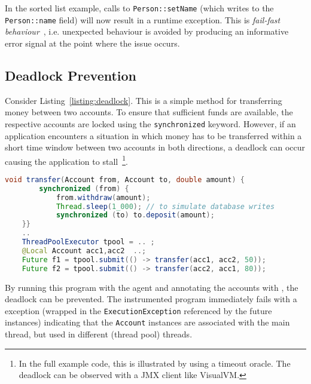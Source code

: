 In the sorted list example, calls to \texttt{Person::setName} (which writes to the \texttt{Person::name} field) will now result in a runtime exception. 
This is \textit{fail-fast behaviour}~\cite{shore2004fail}, i.e. unexpected behaviour is avoided by producing an informative error signal at the point where the issue occurs. 

\subsection{Deadlock Prevention}	

Consider Listing~\ref{listing:deadlock}.  This is a simple method for transferring money between two accounts. To ensure that sufficient funds are available, the respective accounts are locked using the \texttt{synchronized} keyword.  However, if an application encounters a situation in which money has to be transferred within a short time window between two accounts in both directions, a deadlock can occur causing the application to stall~\footnote{In the full example code, this is illustrated by using a timeout oracle. The deadlock can be observed with a JMX client like VisualVM.}.


\begin{lstlisting}[language=Java, caption=Money transfer implementation prone to deadlock, label=listing:deadlock]
	void transfer(Account from, Account to, double amount) {
		synchronized (from) {
			from.withdraw(amount);
			Thread.sleep(1_000); // to simulate database writes 
			synchronized (to) to.deposit(amount);
	}}
	.. 
	ThreadPoolExecutor tpool = .. ;
	@Local Account acc1,acc2  ..;
	Future f1 = tpool.submit(() -> transfer(acc1, acc2, 50)); 
	Future f2 = tpool.submit(() -> transfer(acc2, acc1, 80));
\end{lstlisting}

By  running this program with the \jdala agent and annotating the accounts with \Local , the deadlock can be prevented. The instrumented program immediately fails with a \jdala exception (wrapped in the \texttt{ExecutionException} referenced by the future instances) indicating that the \texttt{Account} instances are associated with the main thread, but used in different (thread pool) threads. 
